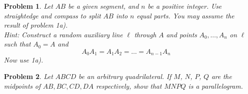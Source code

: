 \documentclass[a4paper,12pt]{article}
\theoremstyle{perfect}
\newtheorem{prb}{Problem}
\begin{document}
\begin{prb}
Let $AB$ be a given segment, and $n$ be a positive integer. Use straightedge and compass to split $AB$ into $n$ equal parts. You may assume the result of problem 1a).\\
\textit{Hint: Construct a random auxiliary line $\ell$ through $A$ and points $A_0, \ldots, A_{n}$ on $\ell$ such that $A_0 = A$ and $$A_0A_1 = A_1A_2 = \ldots = A_{n-1}A_n$$ Now use 1a).}
\end{prb}

\begin{prb}
Let $ABCD$ be an arbitrary quadrilateral. If $M$, $N$, $P$, $Q$ are the midpoints of $AB, BC, CD, DA$ respectively, show that $MNPQ$ is a parallelogram.
\end{prb}
\end{document}
